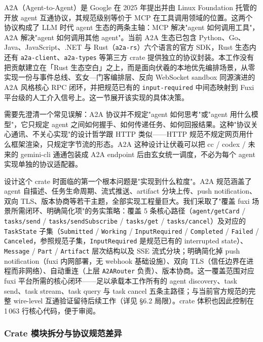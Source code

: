 A2A（Agent-to-Agent）是 Google 在 2025 年提出并由 Linux Foundation 托管的开放 agent 互通协议\cite{a2aproject2025a2a}，其规范级别等价于 MCP 在工具调用领域的位置\cite{anthropic2024mcp}。这两个协议构成了 LLM 时代 agent 生态的两条主轴：MCP 解决"agent 如何调用工具"，A2A 解决"agent 如何调用其他 agent"。当前 A2A 生态已包含 Python、Go、Java、JavaScript、.NET 与 Rust（\texttt{a2a-rs}）六个语言的官方 SDK，Rust 生态内还有 \texttt{a2a-client}、\texttt{a2a-types} 等第三方 crate 提供独立的协议封装。本工作没有把贡献建立在「Rust 生态空白」之上，而是面向伏羲的本地优先编排场景，从零实现一份与事件总线、玄女—门客编排层、反向 WebSocket sandbox 同源演进的 A2A 风格核心 RPC 闭环，并把规范已有的 \texttt{input-required} 中间态映射到 Fuxi 平台级的人工介入信号上。这一节展开该实现的具体决策。

需要先澄清一个常见误解：A2A 协议并不规定"agent 如何思考"或"agent 用什么模型"，它只规定 agent 之间如何握手、如何传递任务、如何回报结果。这种"协议关心通讯、不关心实现"的设计哲学跟 HTTP 类似——HTTP 规范不规定网页用什么框架渲染，只规定字节流的形态。A2A 这种设计让伏羲可以把 cc / codex / 未来的 gemini-cli 通通包装成 A2A endpoint 后由玄女统一调度，不必为每个 agent 实现单独的协议适配器。

设计这个 crate 时面临的第一个根本问题是"实现到什么粒度"。A2A 规范涵盖了 agent 自描述、任务生命周期、流式推送、artifact 分块上传、push notification、双向 TLS、版本协商等若干主题，全部实现工程量巨大。我们采取了"覆盖 fuxi 场景所需闭环、明确简化项"的务实策略：覆盖 5 条核心路径（\texttt{agent/getCard} / \texttt{tasks/send} / \texttt{tasks/sendSubscribe} / \texttt{tasks/get} / \texttt{tasks/cancel}）及对应的 \texttt{TaskState} 子集（\texttt{Submitted} / \texttt{Working} / \texttt{InputRequired} / \texttt{Completed} / \texttt{Failed} / \texttt{Canceled}，参照规范子集，\texttt{InputRequired} 是规范已有的 interrupted state）、\texttt{Message} / \texttt{Part} / \texttt{Artifact} 层次结构以及 SSE 流式分块；明确简化掉 push notification（fuxi 内网部署，无 webhook 基础设施）、双向 TLS（信任边界在进程而非网络）、自动重连（上层 \texttt{A2ARouter} 负责）、版本协商。这一覆盖范围对应 fuxi 平台所需的核心闭环——足以承载本工作所有的 agent discovery、task send、task stream、task query 与 task cancel 五条主路径；与当前官方规范的完整 wire-level 互通验证留待后续工作（详见 §6.2 局限）。crate 体积也因此控制在 1\,063 行核心代码，便于审阅。

\subsubsection{Crate 模块拆分与协议规范差异}

